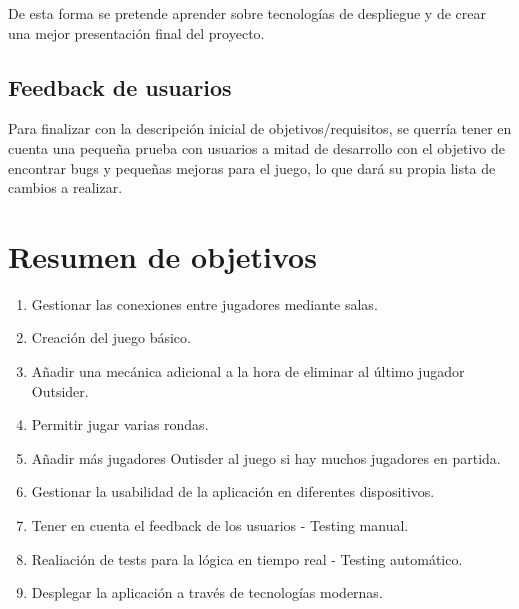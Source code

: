 De esta forma se pretende aprender sobre tecnologías de despliegue y de crear una mejor presentación final del proyecto.

\subsection{Feedback de usuarios}

Para finalizar con la descripción inicial de objetivos/requisitos, se querría tener en cuenta una pequeña prueba con usuarios a mitad de
desarrollo con el objetivo de encontrar bugs y pequeñas mejoras para el juego, lo que dará su propia lista de cambios a realizar.

\section{Resumen de objetivos}

\begin{enumerate}
    \item Gestionar las conexiones entre jugadores mediante salas.
    \item Creación del juego básico.
    \item Añadir una mecánica adicional a la hora de eliminar al último jugador Outsider.
    \item Permitir jugar varias rondas.
    \item Añadir más jugadores Outisder al juego si hay muchos jugadores en partida.
    \item Gestionar la usabilidad de la aplicación en diferentes dispositivos.
    \item Tener en cuenta el feedback de los usuarios - Testing manual.
    \item Realiación de tests para la lógica en tiempo real - Testing automático.
    \item Desplegar la aplicación a través de tecnologías modernas.
\end{enumerate}